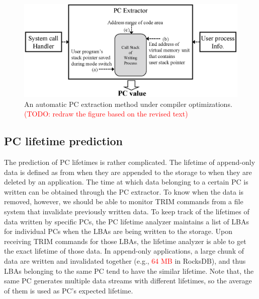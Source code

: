 \begin{figure}[t]
	\centering
	\includegraphics[width=1\linewidth]{figure/getpc}
	\vspace{-10pt}
	\caption{An automatic PC extraction method under compiler optimizations.
	\textcolor{red}{(TODO: redraw the figure based on the revised text)}
	}
	\label{fig:getpc}
	\vspace{-15pt}
\end{figure}


\vspace{-5pt}
\subsection{PC lifetime prediction}
The prediction of PC lifetimes is rather complicated. The lifetime of
append-only data is defined as from when they are appended to the storage to
when they are deleted by an application. The time at which data belonging to a
certain PC is written can be obtained through the PC extractor. To know when
the data is removed, however, we should be able to monitor TRIM commands from a
file system that invalidate previously written data.  To keep track of the
lifetimes of data written by specific PCs, the PC lifetime analyzer maintains a
list of LBAs for individual PCs when the LBAs are being written to the storage.
Upon receiving TRIM commands for those LBAs, the lifetime analyzer is able to
get the exact lifetime of those data. In append-only applications, a large
chunk of data are written and invalidated together (e.g., \textcolor{red}{64
MB} in RocksDB), and thus LBAs belonging to the same PC tend to have the
similar lifetime. Note that, the same PC generates multiple data streams with
different lifetimes, so the average of them is used as PC's expected lifetime.


\vspace{-5pt}
